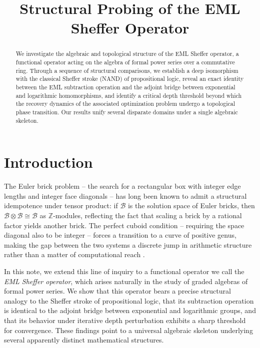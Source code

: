 \documentclass{article}
\title{Structural Probing of the EML Sheffer Operator}
\author{}
\date{}
\begin{document}
\maketitle

\begin{abstract}
We investigate the algebraic and topological structure of the EML Sheffer operator, a functional operator acting on the algebra of formal power series over a commutative ring. Through a sequence of structural comparisons, we establish a deep isomorphism with the classical Sheffer stroke (NAND) of propositional logic, reveal an exact identity between the EML subtraction operation and the adjoint bridge between exponential and logarithmic homomorphisms, and identify a critical depth threshold beyond which the recovery dynamics of the associated optimization problem undergo a topological phase transition. Our results unify several disparate domains under a single algebraic skeleton.
\end{abstract}

\section{Introduction}

The Euler brick problem -- the search for a rectangular box with integer edge lengths and integer face diagonals -- has long been known to admit a structural idempotence under tensor product: if $\mathcal{B}$ is the solution space of Euler bricks, then $\mathcal{B} \otimes \mathcal{B} \cong \mathcal{B}$ as $\mathbb{Z}$-modules, reflecting the fact that scaling a brick by a rational factor yields another brick. The perfect cuboid condition -- requiring the space diagonal also to be integer -- forces a transition to a curve of positive genus, making the gap between the two systems a discrete jump in arithmetic structure rather than a matter of computational reach \cite{unknown}.

In this note, we extend this line of inquiry to a functional operator we call the \emph{EML Sheffer operator}, which arises naturally in the study of graded algebras of formal power series. We show that this operator bears a precise structural analogy to the Sheffer stroke of propositional logic, that its subtraction operation is identical to the adjoint bridge between exponential and logarithmic groups, and that its behavior under iterative depth perturbation exhibits a sharp threshold for convergence. These findings point to a universal algebraic skeleton underlying several apparently distinct mathematical structures.
\end{document}
